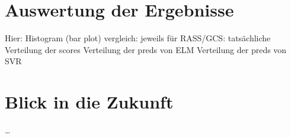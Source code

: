 \section{Auswertung der Ergebnisse}
Hier: Histogram (bar plot) vergleich: jeweils für RASS/GCS:
tatsächliche Verteilung der scores
Verteilung der preds von ELM
Verteilung der preds von SVR

\section{Blick in die Zukunft}
\dots

